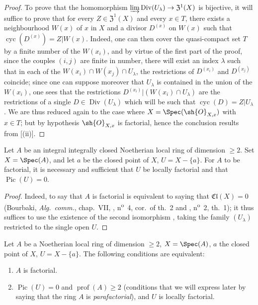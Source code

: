 \begin{proof}
To prove that the homomorphism $\varinjlim\operatorname{Div}(U_\lambda)\to\mathfrak{Z}^1(X)$ is bijective, it will suffice to prove that for every $Z\in\mathfrak{Z}^1(X)$ and every $x\in T$, there exists a neighbourhood $W(x)$ of $x$ in $X$ and a divisor $D^{(x)}$ on $W(x)$ such that $\operatorname{cyc}(D^{(x)})=Z|W(x)$.
Indeed, one can then cover the quasi-compact set $T$ by a finite number of the $W(x_i)$, and by virtue of the first part of the proof, since the couples $(i,j)$ are finite in number, there will exist an index $\lambda$ such that in each of the $W(x_i)\cap W(x_j)\cap U_\lambda$, the restrictions of $D^{(x_i)}$ and $D^{(x_j)}$ coincide;
since one can suppose moreover that $U_\lambda$ is contained in the union of the $W(x_i)$, one sees that the restrictions $D^{(x_i)}|(W(x_i)\cap U_\lambda)$ are the restrictions of a single $D\in\operatorname{Div}(U_\lambda)$ which will be such that $\operatorname{cyc}(D)=Z|U_\lambda$.
We are thus reduced again to the case where $X=\Spec(\sh{O}_{X,x})$ with $x\in T$;
but by hypothesis $\sh{O}_{X,x}$ is factorial, hence the conclusion results from [(ii)].
\end{proof}

\begin{corollary}[21.6.13]
\label{IV.21.6.13}
Let $A$ be an integral integrally closed Noetherian local ring of dimension $\geq 2$.
Set $X=\Spec(A)$, and let $a$ be the closed point of $X$, $U=X-\{a\}$.
For $A$ to be factorial, it is necessary and sufficient that $U$ be locally factorial and that $\operatorname{Pic}(U)=0$.
\end{corollary}

\begin{proof}
Indeed, to say that $A$ is factorial is equivalent to saying that $\mathfrak{Cl}(X)=0$ (Bourbaki, \emph{Alg.~comm.}, chap.~VII, , n\textsuperscript{o}~4, cor.\ of th.~2 and , n\textsuperscript{o}~2, th.~1);
it thus suffices to use the existence of the second isomorphism , taking the family $(U_\lambda)$ restricted to the single open $U$.
\end{proof}

\begin{corollary}[21.6.14]
\label{IV.21.6.14}
Let $A$ be a Noetherian local ring of dimension $\geq 2$, $X=\Spec(A)$, $a$ the closed point of $X$, $U=X-\{a\}$.
The following conditions are equivalent:
\begin{enumerate}[label=\emph{\alph*)}]
  \item $A$ is factorial.
  \item $\operatorname{Pic}(U)=0$ and $\operatorname{prof}(A)\geq 2$ (conditions that we will express later  by saying that the ring $A$ is \emph{parafactorial}), and $U$ is locally factorial.
\end{enumerate}
\end{corollary}

